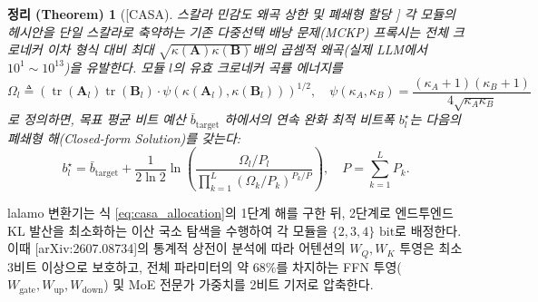 \documentclass[10pt,a4paper]{article}
\newtheorem{theorem}{정리 (Theorem)}[section]
\begin{document}
\begin{theorem}[[CASA] 스칼라 민감도 왜곡 상한 및 폐쇄형 할당 \cite{yoshida2026casa}]
각 모듈의 헤시안을 단일 스칼라로 축약하는 기존 다중선택 배낭 문제(MCKP) 프록시는 전체 크로네커 이차 형식 대비 최대 $\sqrt{\kappa(\mathbf{A})\kappa(\mathbf{B})}$배의 곱셈적 왜곡(실제 LLM에서 $10^1 \sim 10^{13}$)을 유발한다. 모듈 $l$의 유효 크로네커 곡률 에너지를
\begin{equation}
\Omega_l \triangleq \left( \operatorname{tr}(\mathbf{A}_l) \operatorname{tr}(\mathbf{B}_l) \cdot \psi(\kappa(\mathbf{A}_l), \kappa(\mathbf{B}_l)) \right)^{1/2}, \quad \psi(\kappa_A, \kappa_B) = \frac{(\kappa_A + 1)(\kappa_B + 1)}{4\sqrt{\kappa_A \kappa_B}}
\end{equation}
로 정의하면, 목표 평균 비트 예산 $\bar{b}_{\text{target}}$ 하에서의 연속 완화 최적 비트폭 $b_l^\star$는 다음의 폐쇄형 해(Closed-form Solution)를 갖는다:
\begin{equation}
b_l^\star = \bar{b}_{\text{target}} + \frac{1}{2 \ln 2} \ln \left( \frac{\Omega_l / P_l}{\prod_{k=1}^L (\Omega_k / P_k)^{P_k / P}} \right), \quad P = \sum_{k=1}^L P_k.
\label{eq:casa_allocation}
\end{equation}
\end{theorem}
\textsf{lalamo} 변환기는 식 \eqref{eq:casa_allocation}의 1단계 해를 구한 뒤, 2단계로 엔드투엔드 KL 발산을 최소화하는 이산 국소 탐색을 수행하여 각 모듈을 $\{2, 3, 4\}\text{ bit}$로 배정한다. 이때 [arXiv:2607.08734]의 통계적 상전이 분석에 따라 어텐션의 $W_Q, W_K$ 투영은 최소 3비트 이상으로 보호하고, 전체 파라미터의 약 $68\%$를 차지하는 FFN 투영($W_{\text{gate}}, W_{\text{up}}, W_{\text{down}}$) 및 MoE 전문가 가중치를 2비트 기저로 압축한다.
\end{document}
